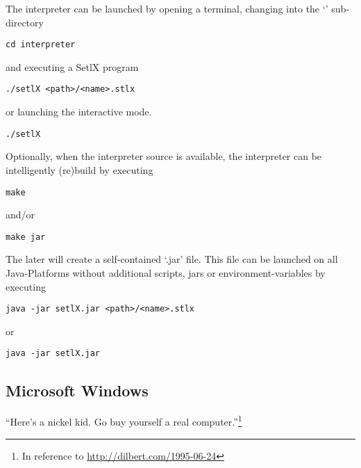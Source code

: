 The \setlX{} interpreter can be launched by opening a terminal, changing into the `' sub-directory

\begin{lstlisting}[frame=none,numbers=none]
cd interpreter
\end{lstlisting}

and executing a SetlX program

\begin{lstlisting}[frame=none,numbers=none]
./setlX <path>/<name>.stlx
\end{lstlisting}

or launching the interactive mode.

\begin{lstlisting}[frame=none,numbers=none]
./setlX
\end{lstlisting}

\vspace{1em}

Optionally, when the interpreter source is available, the interpreter can be intelligently (re)build by executing

\begin{lstlisting}[frame=none,numbers=none]
make
\end{lstlisting}

and/or

\begin{lstlisting}[frame=none,numbers=none]
make jar
\end{lstlisting}

The later will create a self-contained `.jar' file. This file can be launched on all Java-Platforms without additional scripts, jars or environment-variables by executing

\begin{lstlisting}[frame=none,numbers=none]
java -jar setlX.jar <path>/<name>.stlx
\end{lstlisting}

or

\begin{lstlisting}[frame=none,numbers=none]
java -jar setlX.jar
\end{lstlisting}

\subsection{Microsoft Windows}

\begin{center}
\large
``Here's a nickel kid. Go buy yourself a real computer.''\footnote{In reference to \url{http://dilbert.com/1995-06-24}}
\end{center}

